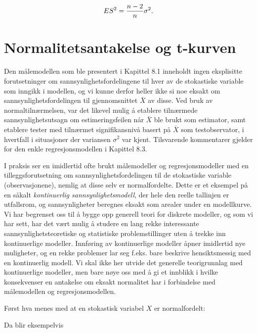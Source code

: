 \[ES^2={n-2\over n}\sigma ^2.\]
\normalsize

\section {Normalitetsantakelse og t-kurven}

Den målemodellen som ble presentert i Kapittel 8.1 inneholdt
ingen eks\-plisitte forutsetninger om sannsynlighetsfordelingene til
hver av de sto\-kas\-tiske variable som inngikk i modellen, og vi
kunne derfor heller ikke si noe eksakt om
sannsynlighetsfordelingen til gjennomsnittet $\bar X$ av disse.
Ved bruk av normaltilnærmelsen, var det likevel mulig å
etablere tilnærmede sannsynlighetsutsagn om estimeringsfeilen
når $\bar X$ ble brukt som estimator, samt etablere tester
med tilnærmet signifikansnivå basert på $\bar X$ som
test\-observator, i hvertfall i situasjoner der variansen
$\sigma ^2$ var kjent. Tilsvarende kommentarer gjelder for den
enkle regresjonsmodellen i Kapittel 8.3. 

I praksis ser en
imidlertid ofte brukt målemodeller og regresjonsmodeller med
en tilleggsforutsetning om sannsynlighetsfordelingen til de
stokastiske variable (observasjonene), nemlig at disse selv er
normalfordelte. Dette er et eksempel på en såkalt {\em
kontinuerlig sannsynlighetsmodell}, der hele den reelle
tallinjen er utfallsrom, og sannsynligheter beregnes eksakt som
arealer under en modellkurve. Vi har begrenset
oss til å bygge opp generell teori for diskrete modeller, og som vi har
sett, har det vært mulig å studere en lang rekke
interessante sannsynlighets\-teoretiske og statistiske
problemstillinger uten å trekke inn kontinuerlige modeller.
Innføring av kontinuerlige mo\-del\-ler åpner imidlertid nye
muligheter, og en rekke problemer lar seg f.eks. bare beskrive
hensikts\-messig med en kontinuerlig modell. Vi skal ikke her
utvide det generelle teorigrunnlag med kontinuerlige modeller,
men bare nøye oss med å gi et innblikk i hvilke konsekvenser en
antakelse om eksakt normalitet har i forbindelse med
målemodellen og regresjonsmodellen.

Først hva menes med at en stokastisk variabel $X$ er
normalfordelt:

\begin{center}  \end{center}
Da blir eksempelvis

